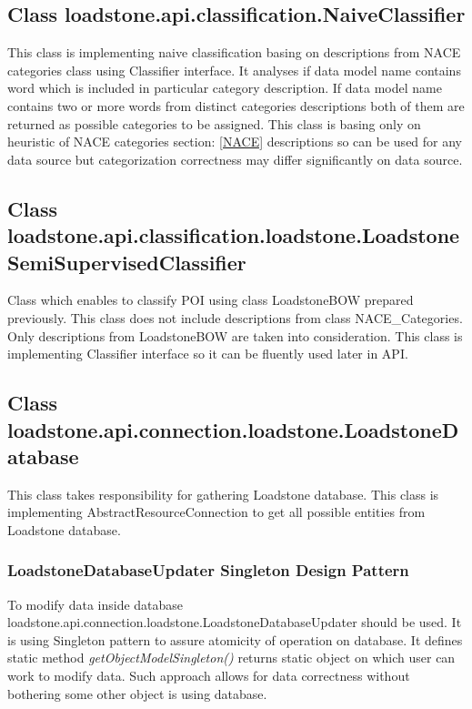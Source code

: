 \subsection{Class \newline loadstone.api.classification.NaiveClassifier}
\label{naive_classifier}
This class is implementing naive classification basing on descriptions from NACE categories class using Classifier interface. It analyses if data model name contains word which is included in particular category description. If data model name contains two or more words from distinct categories descriptions both of them are returned as possible categories to be assigned. This class is basing only on heuristic of NACE categories section: \ref{NACE} descriptions so can be used for any data source but categorization correctness may differ significantly on data source.

\subsection{Class \newline loadstone.api.classification.loadstone.\newline LoadstoneSemiSupervisedClassifier}
Class which enables to classify POI using class LoadstoneBOW prepared previously. This class does not include descriptions from class NACE\_Categories. Only descriptions from LoadstoneBOW are taken into consideration. This class is implementing Classifier interface so it can be fluently used later in API.

\subsection{Class \newline loadstone.api.connection.loadstone.LoadstoneDatabase}
This class takes responsibility for gathering Loadstone database. This class is implementing AbstractResourceConnection to get all possible entities from Loadstone database. 

\subsubsection{LoadstoneDatabaseUpdater Singleton Design Pattern}
To modify data inside database loadstone.api.connection.loadstone.LoadstoneDatabaseUpdater should be used. It is using Singleton pattern to assure atomicity of operation on database. It defines static method \textit{getObjectModelSingleton()} returns static object on which user can work to modify data. Such approach allows for data correctness without bothering some other object is using database.  

